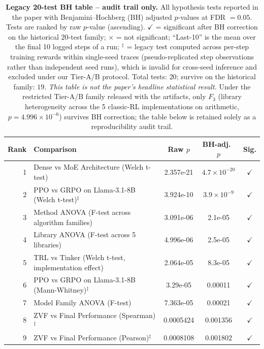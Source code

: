 \begin{table}[!ht]
\centering
\caption{\textbf{Legacy 20-test BH table -- audit trail only.} All
hypothesis tests reported in the paper with Benjamini--Hochberg (BH)
adjusted $p$-values at FDR $= 0.05$.  Tests are ranked by raw
$p$-value (ascending). $\checkmark$ = significant after BH correction
on the historical $20$-test family; $\times$ = not significant; ``Last-10'' is the mean over the final 10 logged steps of a run; $^{\ddag}$ = legacy test computed across per-step training rewards within single-seed traces (pseudo-replicated step observations rather than independent seed runs), which is invalid for cross-seed inference and excluded under our Tier-A/B protocol. Total
tests: $20$; survive on the historical family: $19$. \emph{This
table is not the paper's headline statistical result.} Under the restricted Tier-A/B family released with the artifacts,
only $F_3$ (library heterogeneity across the 5 classic-RL implementations on
arithmetic, $p = 4.996 \times 10^{-6}$) survives BH correction; the table below is retained solely as a
reproducibility audit trail.}
\label{tab:bh-pvalues}
\scriptsize
\begin{tabular}{@{}rp{6.2cm}ccc@{}}
\toprule
Rank & Comparison & Raw $p$ & BH-adj.\ $p$ & Sig. \\
\midrule
        1 & Dense vs MoE Architecture (Welch t-test) & 2.357e-21 & $4.7\times10^{-20}$ & $\checkmark$ \\
        2 & PPO vs GRPO on Llama-3.1-8B (Welch t-test)$^{\ddag}$ & 3.924e-10 & $3.9\times10^{-9}$ & $\checkmark$ \\
        3 & Method ANOVA (F-test across algorithm families) & 3.091e-06 & 2.1e-05 & $\checkmark$ \\
        4 & Library ANOVA (F-test across 5 libraries) & 4.996e-06 & 2.5e-05 & $\checkmark$ \\
        5 & TRL vs Tinker (Welch t-test, implementation effect) & 2.064e-05 & 8.3e-05 & $\checkmark$ \\
        6 & PPO vs GRPO on Llama-3.1-8B (Mann-Whitney)$^{\ddag}$ & 3.29e-05 & 0.00011 & $\checkmark$ \\
        7 & Model Family ANOVA (F-test) & 7.363e-05 & 0.00021 & $\checkmark$ \\
        8 & ZVF vs Final Performance (Spearman)$^{\ddag}$ & 0.0005424 & 0.001356 & $\checkmark$ \\
        9 & ZVF vs Final Performance (Pearson)$^{\ddag}$ & 0.0008108 & 0.001802 & $\checkmark$ \\

\end{tabular}
\end{table}
